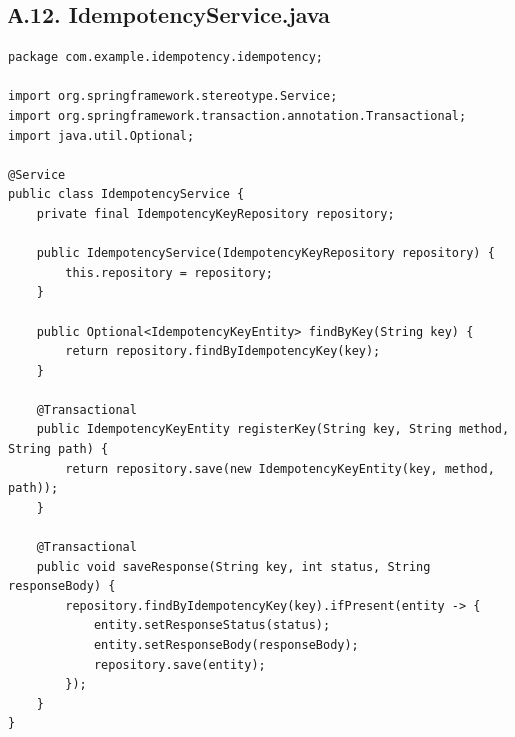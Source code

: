 \subsection*{А.12. IdempotencyService.java}
\begin{lstlisting}[caption={IdempotencyService.java --- сервис управления ключами}]
package com.example.idempotency.idempotency;

import org.springframework.stereotype.Service;
import org.springframework.transaction.annotation.Transactional;
import java.util.Optional;

@Service
public class IdempotencyService {
    private final IdempotencyKeyRepository repository;

    public IdempotencyService(IdempotencyKeyRepository repository) {
        this.repository = repository;
    }

    public Optional<IdempotencyKeyEntity> findByKey(String key) {
        return repository.findByIdempotencyKey(key);
    }

    @Transactional
    public IdempotencyKeyEntity registerKey(String key, String method, String path) {
        return repository.save(new IdempotencyKeyEntity(key, method, path));
    }

    @Transactional
    public void saveResponse(String key, int status, String responseBody) {
        repository.findByIdempotencyKey(key).ifPresent(entity -> {
            entity.setResponseStatus(status);
            entity.setResponseBody(responseBody);
            repository.save(entity);
        });
    }
}
\end{lstlisting}

